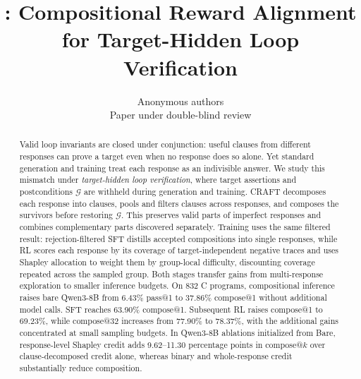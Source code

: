 \documentclass{article}
\title{\sam{}: Compositional Reward Alignment\\
for Target-Hidden Loop Verification}
\author{
  Anonymous authors\\
  Paper under double-blind review
}
\begin{document}
\maketitle

\begin{abstract}
Valid loop invariants are closed under conjunction: useful clauses from
different responses can prove a target even when no response does so alone.
Yet standard generation and training treat each response as an indivisible
answer.  We study this mismatch under \emph{target-hidden loop verification},
where target assertions and postconditions \(\mathcal G\) are withheld during
generation and training.  CRAFT decomposes each response into clauses, pools
and filters clauses across responses, and composes the survivors before
restoring \(\mathcal G\).  This preserves valid parts of imperfect responses
and combines complementary parts discovered separately.  Training uses the
same filtered result: rejection-filtered SFT distills accepted compositions
into single responses, while RL scores each response by its coverage of
target-independent negative traces and uses Shapley allocation to weight them
by group-local difficulty, discounting coverage repeated across the sampled
group.  Both stages transfer gains from
multi-response exploration to smaller inference budgets.  On 832 C programs, compositional inference
raises bare Qwen3-8B from 6.43\% pass@1 to 37.86\% compose@1 without additional
model calls.  SFT reaches 63.90\% compose@1.  Subsequent RL raises compose@1
to 69.23\%, while compose@32 increases from 77.90\% to 78.37\%, with the
additional gains concentrated at small sampling budgets.
In Qwen3-8B ablations initialized from Bare, response-level
Shapley credit adds 9.62--11.30
percentage points in compose@\(k\) over clause-decomposed credit alone, whereas
binary and whole-response credit substantially reduce composition.
\end{abstract}













\newpage
\appendix

\end{document}
